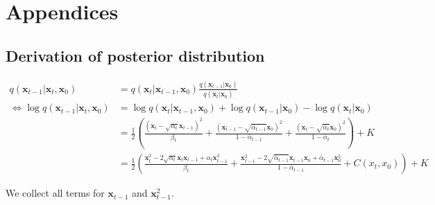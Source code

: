 \chapter{Appendices}

\section{Derivation of posterior distribution} \label{appendix:q-posterior-derivation}
\begin{align*}
    q(\mathbf{x}_{t-1} \vert \mathbf{x}_t, \mathbf{x}_0) &= q(\mathbf{x}_t \vert \mathbf{x}_{t-1}, \mathbf{x}_0) \frac{q(\mathbf{x}_{t-1} \vert \mathbf{x}_0)}{q(\mathbf{x}_t \vert \mathbf{x}_0)} \\
    \Leftrightarrow \log q(\mathbf{x}_{t-1} \vert \mathbf{x}_t, \mathbf{x}_0) &= \log q(\mathbf{x}_t \vert \mathbf{x}_{t-1}, \mathbf{x}_0) + 
    \log q(\mathbf{x}_{t-1} \vert \mathbf{x}_0) - \log q(\mathbf{x}_t \vert \mathbf{x}_0) \\
    &= \frac{1}{2} \left( 
        \frac{\left( \mathbf{x}_t - \sqrt{\alpha_t} \mathbf{x}_{t-1} \right)^2}{\beta_t} +
        \frac{\left( \mathbf{x}_{t-1} - \sqrt{\bar{\alpha}_{t-1}} \mathbf{x}_0 \right)^2}{1 - \bar{\alpha}_{t-1}} + 
        \frac{\left( \mathbf{x}_{t} - \sqrt{\bar{\alpha}_{t}} \mathbf{x}_0 \right)^2}{1 - \bar{\alpha}_{t}}
    \right) + K \\
    &= \frac{1}{2} \left(
        \frac{\mathbf{x}_t^2 - 2 \sqrt{\alpha_t}\mathbf{x}_t \mathbf{x}_{t-1} + \alpha_t \mathbf{x}_{t-1}^2}{\beta_t} +
        \frac{\mathbf{x}_{t-1}^2 - 2  \sqrt{\bar{\alpha}_{t-1}} \mathbf{x}_{t-1} \mathbf{x}_0 + \bar{\alpha}_{t-1}\mathbf{x}_0^2  }{1 - \bar{\alpha}_{t-1}} + C(x_t, x_0)
    \right) + K
\end{align*}

We collect all terms for $\mathbf{x}_{t-1}$ and $\mathbf{x}_{t-1}^2$. 
